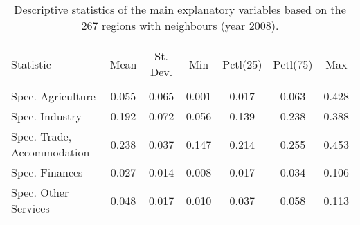 \documentclass[11pt]{article}
\begin{document}
\begin{table}[!htbp] \centering 
  \caption{Descriptive statistics of the main explanatory variables based on the 267 regions with neighbours (year 2008).} 
  \label{descriptive_vars_filtered} 
\begin{tabular}{@{\extracolsep{5pt}}lcccccc} 
\\[-1.8ex]\hline 
\hline \\[-1.8ex] 
Statistic  & \multicolumn{1}{c}{Mean} & \multicolumn{1}{c}{St. Dev.} & \multicolumn{1}{c}{Min} & \multicolumn{1}{c}{Pctl(25)} & \multicolumn{1}{c}{Pctl(75)} & \multicolumn{1}{c}{Max} \\ 
\hline \\[-1.8ex] 
Spec. Agriculture & 0.055 & 0.065 & 0.001 & 0.017 & 0.063 & 0.428 \\ 
Spec. Industry  & 0.192 & 0.072 & 0.056 & 0.139 & 0.238 & 0.388 \\ 
Spec. Trade, Accommodation  & 0.238 & 0.037 & 0.147 & 0.214 & 0.255 & 0.453 \\ 
Spec. Finances  & 0.027 & 0.014 & 0.008 & 0.017 & 0.034 & 0.106 \\ 
Spec. Other Services & 0.048 & 0.017 & 0.010 & 0.037 & 0.058 & 0.113 \\ 

\end{tabular}
\end{table}
\end{document}
